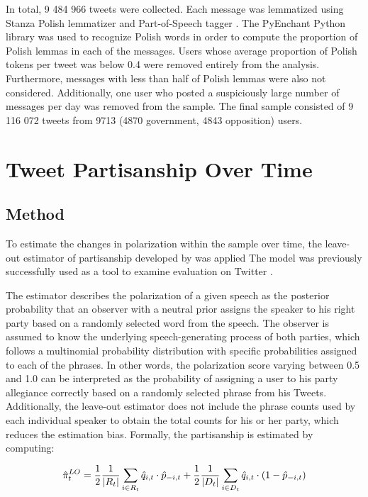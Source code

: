 \documentclass{article}
\begin{document}
	In total, 9 484 966 tweets were collected. Each message was lemmatized using Stanza Polish lemmatizer and Part-of-Speech tagger \citep{qi2020}. The PyEnchant Python library was used to recognize Polish words in order to compute the proportion of Polish lemmas in each of the messages. Users whose average proportion of Polish tokens per tweet was below 0.4 were removed entirely from the analysis. Furthermore, messages with less than half of Polish lemmas were also not considered. Additionally, one user who posted a suspiciously large number of messages per day was removed from the sample. The final sample consisted of 9 116 072 tweets from 9713 (4870 government, 4843 opposition) users.
	
	
	\section*{Tweet Partisanship Over Time}
	
	\subsection*{Method}
	
	To estimate the changes in polarization within the sample over time, the leave-out estimator of partisanship developed by \citet*{gentzkow2019} was applied The model was previously successfully used as a tool to examine evaluation on Twitter \citep{demszky2019}. 
	
	The estimator describes the polarization of a given speech as the posterior probability that an observer with a neutral prior assigns the speaker to his right party based on a randomly selected word from the speech. The observer is assumed to know the underlying speech-generating process of both parties, which follows a multinomial probability distribution with specific probabilities assigned to each of the phrases. In other words, the polarization score varying between 0.5 and 1.0 can be interpreted as the probability of assigning a user to his party allegiance correctly based on a randomly selected phrase from his Tweets. Additionally, the leave-out estimator does not include the phrase counts used by each individual speaker to obtain the total counts for his or her party, which reduces the estimation bias. Formally, the partisanship is estimated by computing: 
	
	\begin{equation}
		\hat{\pi}_{t}^{LO} = \frac{1}{2} \frac{1}{|R_{t}|} \sum_{i \in R_{t}} \hat{q}_{i,t}  \cdot \hat{p}_{-i,t} +  \frac{1}{2} \frac{1}{|D_{t}|} \sum_{i \in D_{t}} \hat{q}_{i,t}  \cdot (1 - \hat{p}_{-i,t})\\
	\end{equation}
\end{document}
